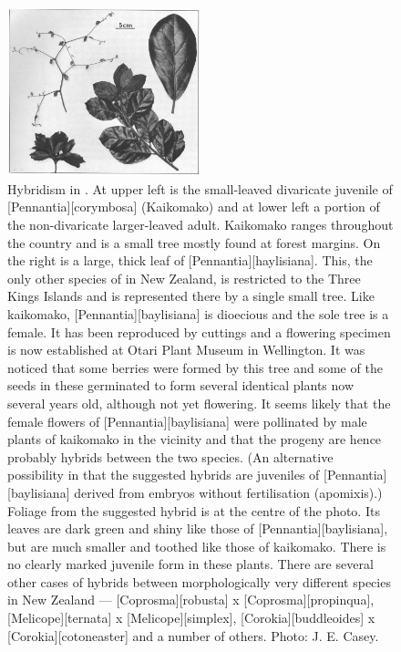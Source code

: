 \begin{figure}
	\includegraphics[width=0.5\textwidth]{graphics/figure79pennantia.jpg}
	\centering
	\caption[Hybridism in Pennantia]{Hybridism in .
	At upper left is the small-leaved divaricate juvenile of [Pennantia][corymbosa] (Kaikomako) and at lower left a portion of the non-divaricate larger-leaved adult.
	Kaikomako ranges throughout the country and is a small tree mostly found at forest margins.
	On the right is a large, thick leaf of [Pennantia][haylisiana].
	This, the only other species of  in New Zealand, is restricted to the Three Kings Islands and is represented there by a single small tree.
	Like kaikomako, [Pennantia][baylisiana] is dioecious and the sole tree is a female.
	It has been reproduced by cuttings and a flowering specimen is now established at Otari Plant Museum in Wellington.
	It was noticed that some berries were formed by this tree and some of the seeds in these germinated to form several identical plants now several years old, although not yet flowering.
	It seems likely that the female flowers of [Pennantia][baylisiana] were pollinated by male plants of kaikomako in the vicinity and that the progeny are hence probably hybrids between the two species. (An alternative possibility in that the suggested hybrids are juveniles of [Pennantia][baylisiana] derived from embryos without fertilisation (apomixis).) Foliage from the suggested hybrid is at the centre of the photo.
	Its leaves are dark green and shiny like those of [Pennantia][baylisiana], but are much smaller and toothed like those of kaikomako.
	There is no clearly marked juvenile form in these plants.
	There are several other cases of hybrids between morphologically very different species in New Zealand --- [Coprosma][robusta] x [Coprosma][propinqua], [Melicope][ternata] x [Melicope][simplex], [Corokia][buddleoides] x [Corokia][cotoneaster] and a number of others.
	Photo:  J. E. Casey.}%
	\label{fig:79pennantia}
\end{figure}

